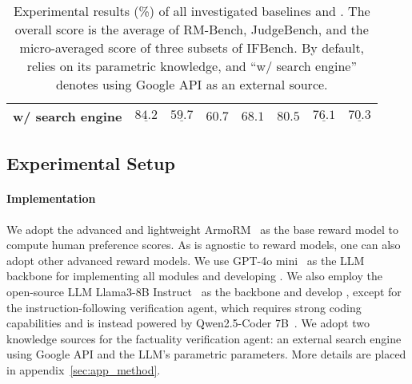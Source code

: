 \begin{table*}
\begin{tabular}{lccccccc}
\quad w/ search engine &$\underline{84.2}$&$\underline{59.7}$&$60.7$&$68.1$&$\boldsymbol{80.5}$&$\underline{76.1}$&$\underline{70.3}$\\
    \bottomrule
    \end{tabular}
    \caption{Experimental results (\%) of all investigated baselines and \ourmethod. The overall score is the average of RM-Bench, JudgeBench, and the micro-averaged score of three subsets of IFBench. By default, \ourmethod relies on its parametric knowledge, and ``w/ search engine'' denotes using Google API as an external source.}
    \label{tab:main_exp}
\end{table*}


\subsection{Experimental Setup}
\label{sec:exp_setup}

\paragraph{\ourmethod Implementation}
We adopt the advanced and lightweight ArmoRM~\citep{wang2024interpretable} as the base reward model to compute human preference scores. As \ourmethod is agnostic to reward models, one can also adopt other advanced reward models. 
We use GPT-4o mini~\citep{OpenAI2024} as the LLM backbone for implementing all modules and developing \ourmethodmini. We also employ the open-source LLM Llama3-8B Instruct~\citep{dubey2024llama} as the backbone and develop \ourmethodllama, except for the instruction-following verification agent, which requires strong coding capabilities and is instead powered by Qwen2.5-Coder 7B~\citep{hui2024qwen2}.
We adopt two knowledge sources for the factuality verification agent: an external search engine using Google API and the LLM’s parametric parameters. More details are placed in appendix~\ref{sec:app_method}.



